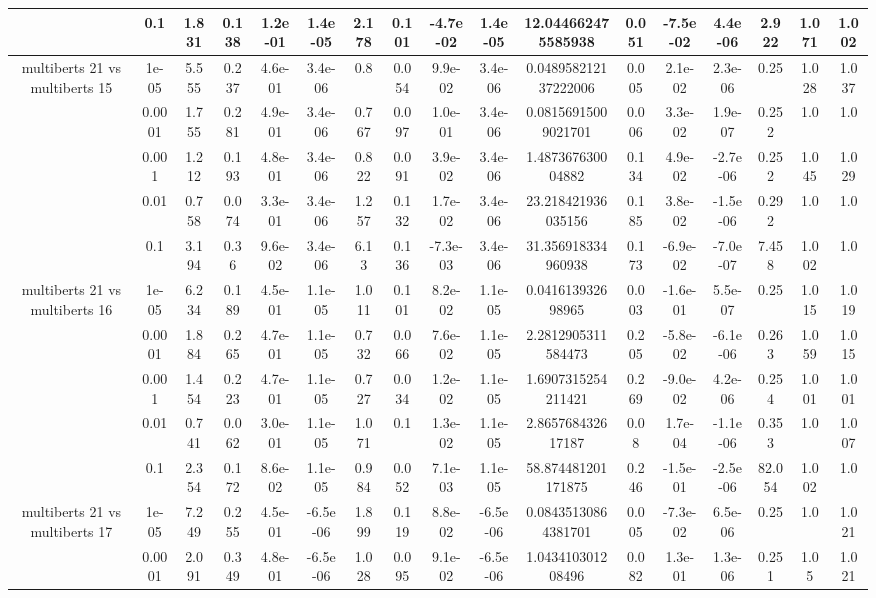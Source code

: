 \begin{tabular}{|c|c|c|c|c|c|c|c|c|c|c|c|c|c|c|c|c|}
 & 0.1 & 1.831 & 0.138 & 1.2e-01 & 1.4e-05 & 2.178 & 0.101 & -4.7e-02 & 1.4e-05 & 12.044662475585938 & 0.051 & -7.5e-02 & 4.4e-06 & 2.922 & 1.071 & 1.002 \\
\hline
\multirow{5}{*}{multiberts 21 vs multiberts 15} & 1e-05 & 5.555 & 0.237 & 4.6e-01 & 3.4e-06 & 0.8 & 0.054 & 9.9e-02 & 3.4e-06 & 0.048958212137222006 & 0.005 & 2.1e-02 & 2.3e-06 & 0.25 & 1.028 & 1.037 \\
 & 0.0001 & 1.755 & 0.281 & 4.9e-01 & 3.4e-06 & 0.767 & 0.097 & 1.0e-01 & 3.4e-06 & 0.08156915009021701 & 0.006 & 3.3e-02 & 1.9e-07 & 0.252 & 1.0 & 1.0 \\
 & 0.001 & 1.212 & 0.193 & 4.8e-01 & 3.4e-06 & 0.822 & 0.091 & 3.9e-02 & 3.4e-06 & 1.487367630004882 & 0.134 & 4.9e-02 & -2.7e-06 & 0.252 & 1.045 & 1.029 \\
 & 0.01 & 0.758 & 0.074 & 3.3e-01 & 3.4e-06 & 1.257 & 0.132 & 1.7e-02 & 3.4e-06 & 23.218421936035156 & 0.185 & 3.8e-02 & -1.5e-06 & 0.292 & 1.0 & 1.0 \\
 & 0.1 & 3.194 & 0.36 & 9.6e-02 & 3.4e-06 & 6.13 & 0.136 & -7.3e-03 & 3.4e-06 & 31.356918334960938 & 0.173 & -6.9e-02 & -7.0e-07 & 7.458 & 1.002 & 1.0 \\
\hline
\multirow{5}{*}{multiberts 21 vs multiberts 16} & 1e-05 & 6.234 & 0.189 & 4.5e-01 & 1.1e-05 & 1.011 & 0.101 & 8.2e-02 & 1.1e-05 & 0.041613932698965 & 0.003 & -1.6e-01 & 5.5e-07 & 0.25 & 1.015 & 1.019 \\
 & 0.0001 & 1.884 & 0.265 & 4.7e-01 & 1.1e-05 & 0.732 & 0.066 & 7.6e-02 & 1.1e-05 & 2.2812905311584473 & 0.205 & -5.8e-02 & -6.1e-06 & 0.263 & 1.059 & 1.015 \\
 & 0.001 & 1.454 & 0.223 & 4.7e-01 & 1.1e-05 & 0.727 & 0.034 & 1.2e-02 & 1.1e-05 & 1.6907315254211421 & 0.269 & -9.0e-02 & 4.2e-06 & 0.254 & 1.001 & 1.001 \\
 & 0.01 & 0.741 & 0.062 & 3.0e-01 & 1.1e-05 & 1.071 & 0.1 & 1.3e-02 & 1.1e-05 & 2.865768432617187 & 0.08 & 1.7e-04 & -1.1e-06 & 0.353 & 1.0 & 1.007 \\
 & 0.1 & 2.354 & 0.172 & 8.6e-02 & 1.1e-05 & 0.984 & 0.052 & 7.1e-03 & 1.1e-05 & 58.874481201171875 & 0.246 & -1.5e-01 & -2.5e-06 & 82.054 & 1.002 & 1.0 \\
\hline
\multirow{5}{*}{multiberts 21 vs multiberts 17} & 1e-05 & 7.249 & 0.255 & 4.5e-01 & -6.5e-06 & 1.899 & 0.119 & 8.8e-02 & -6.5e-06 & 0.08435130864381701 & 0.005 & -7.3e-02 & 6.5e-06 & 0.25 & 1.0 & 1.021 \\
 & 0.0001 & 2.091 & 0.349 & 4.8e-01 & -6.5e-06 & 1.028 & 0.095 & 9.1e-02 & -6.5e-06 & 1.043410301208496 & 0.082 & 1.3e-01 & 1.3e-06 & 0.251 & 1.05 & 1.021 \\

\end{tabular}
